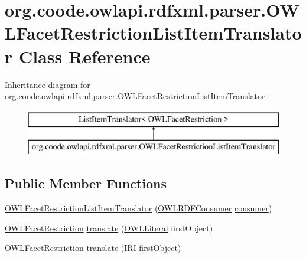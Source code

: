 \hypertarget{classorg_1_1coode_1_1owlapi_1_1rdfxml_1_1parser_1_1_o_w_l_facet_restriction_list_item_translator}{\section{org.\-coode.\-owlapi.\-rdfxml.\-parser.\-O\-W\-L\-Facet\-Restriction\-List\-Item\-Translator Class Reference}
\label{classorg_1_1coode_1_1owlapi_1_1rdfxml_1_1parser_1_1_o_w_l_facet_restriction_list_item_translator}
}
Inheritance diagram for org.\-coode.\-owlapi.\-rdfxml.\-parser.\-O\-W\-L\-Facet\-Restriction\-List\-Item\-Translator\-:\begin{figure}[H]
\begin{center}
\leavevmode
\includegraphics[height=2.000000cm]{classorg_1_1coode_1_1owlapi_1_1rdfxml_1_1parser_1_1_o_w_l_facet_restriction_list_item_translator}
\end{center}
\end{figure}
\subsection*{Public Member Functions}
\begin{DoxyCompactItemize}
\item 
\hyperlink{classorg_1_1coode_1_1owlapi_1_1rdfxml_1_1parser_1_1_o_w_l_facet_restriction_list_item_translator_a61bd69b705e0a42fa828b888985ddc61}{O\-W\-L\-Facet\-Restriction\-List\-Item\-Translator} (\hyperlink{classorg_1_1coode_1_1owlapi_1_1rdfxml_1_1parser_1_1_o_w_l_r_d_f_consumer}{O\-W\-L\-R\-D\-F\-Consumer} \hyperlink{classorg_1_1coode_1_1owlapi_1_1rdfxml_1_1parser_1_1_o_w_l_facet_restriction_list_item_translator_a6a7c4378be98789d2daab67b7bc2fb39}{consumer})
\item 
\hyperlink{interfaceorg_1_1semanticweb_1_1owlapi_1_1model_1_1_o_w_l_facet_restriction}{O\-W\-L\-Facet\-Restriction} \hyperlink{classorg_1_1coode_1_1owlapi_1_1rdfxml_1_1parser_1_1_o_w_l_facet_restriction_list_item_translator_a905654de8851c2109acb507a1a36a6ce}{translate} (\hyperlink{interfaceorg_1_1semanticweb_1_1owlapi_1_1model_1_1_o_w_l_literal}{O\-W\-L\-Literal} first\-Object)
\item 
\hyperlink{interfaceorg_1_1semanticweb_1_1owlapi_1_1model_1_1_o_w_l_facet_restriction}{O\-W\-L\-Facet\-Restriction} \hyperlink{classorg_1_1coode_1_1owlapi_1_1rdfxml_1_1parser_1_1_o_w_l_facet_restriction_list_item_translator_aa9f69f00731f01ab0848e74065b3a933}{translate} (\hyperlink{classorg_1_1semanticweb_1_1owlapi_1_1model_1_1_i_r_i}{I\-R\-I} first\-Object)
\end{DoxyCompactItemize}
